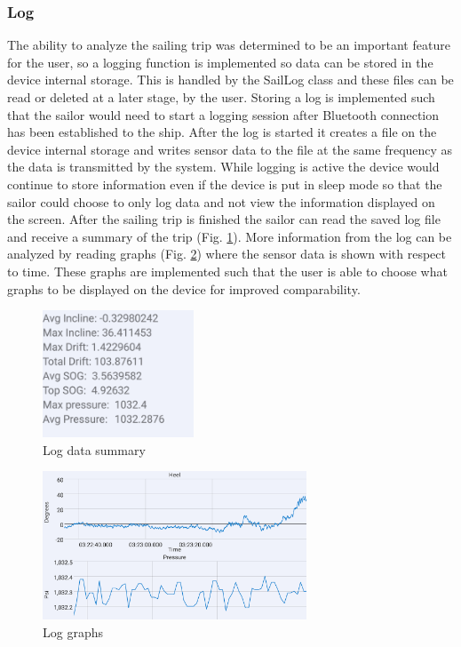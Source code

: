 \subsubsection{Log}
The ability to analyze the sailing trip was determined to be an important feature for the user, so a logging function is implemented so data can be stored in the device internal storage. This is handled by the SailLog class and these files can be read or deleted at a later stage, by the user. Storing a log is implemented such that the sailor would need to start a logging session after Bluetooth connection has been established to the ship. After the log is started it creates a file on the device internal storage and writes sensor data to the file at the same frequency as the data is transmitted by the system. While logging is active the device would continue to store information even if the device is put in sleep mode so that the sailor could choose to only log data and not view the information displayed on the screen. After the sailing trip is finished the sailor can read the saved log file and receive a summary of the trip (Fig. \ref{log-summary}). More information from the log can be analyzed by reading graphs (Fig. \ref{log-graph}) where the sensor data is shown with respect to time. These graphs are implemented such that the user is able to choose what graphs to be displayed on the device for improved comparability.
\begin{figure}[H]
\centering
\includegraphics[width=0.4\textwidth]{Figures/log_data.png}
\caption{Log data summary}
\label{log-summary}
\end{figure}
\begin{figure}[H]
\centering
\includegraphics[width=0.7\textwidth]{Figures/log_graph.png}
\caption{Log graphs}
\label{log-graph}
\end{figure}

